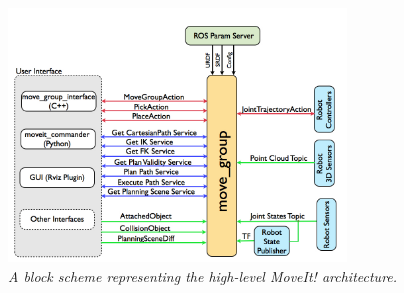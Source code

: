 \begin{figure}
	\centering
	\includegraphics[width=0.8\textwidth]{Images/background_and_tools/moveit.jpg}
	\caption{\textit{A block scheme representing the high-level MoveIt! architecture.}}
	\label{fig:moveItScheme}
\end{figure}






